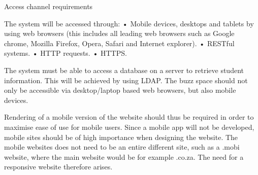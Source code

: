 Access channel requirements

The system will be accessed through:
•	Mobile devices, desktops and tablets by using web browsers (this includes all leading web browsers such as Google chrome, Mozilla Firefox, Opera, Safari and Internet explorer).
•	RESTful systems.
•	HTTP requests.
•	HTTPS.

The system must be able to access a database on a server to retrieve student information. This will be achieved by using LDAP.
The buzz space should not only be accessible via desktop/laptop based web browsers, but also mobile devices.

Rendering of a mobile version of the website should thus be required in order to maximise ease of use for mobile users. Since a mobile app will not be developed, mobile sites should be of high importance when designing the website. The mobile websites does not need to be an entire different site, such as a .mobi website, where the main website would be for example .co.za. The need for a responsive website therefore arises.

